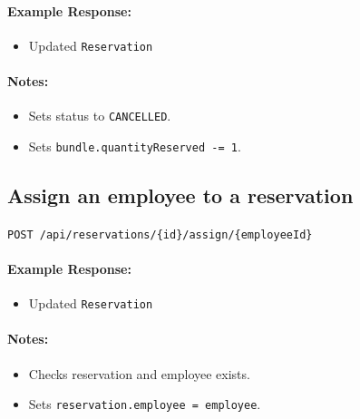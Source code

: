 \documentclass[a4paper,11pt]{article}
\begin{document}
\paragraph{Example Response:}
\begin{itemize}
    \item Updated \texttt{Reservation}
\end{itemize}

\paragraph{Notes:}
\begin{itemize}
    \item Sets status to \texttt{CANCELLED}.
    \item Sets \texttt{bundle.quantityReserved -= 1}.
\end{itemize}

\subsection{Assign an employee to a reservation}
\texttt{POST /api/reservations/\{id\}/assign/\{employeeId\}}

\paragraph{Example Response:}
\begin{itemize}
    \item Updated \texttt{Reservation}
\end{itemize}

\paragraph{Notes:}
\begin{itemize}
    \item Checks reservation and employee exists.
    \item Sets \texttt{reservation.employee = employee}.
\end{itemize}
\end{document}
